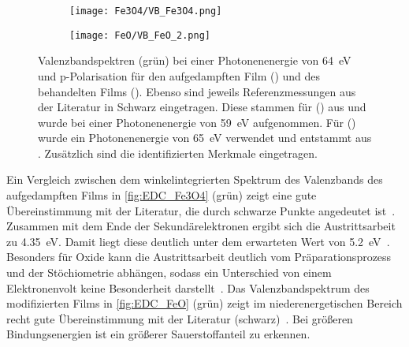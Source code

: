         \begin{figure}
            \begin{subfigure}[t]{0.48\textwidth}
                \centering
                \texttt{[image: Fe3O4/VB\_Fe3O4.png]}
                \subcaption{}
                \label{fig:EDC_Fe3O4}
            \end{subfigure}
            \begin{subfigure}[t]{0.48\textwidth}
                \centering
                \texttt{[image: FeO/VB\_FeO\_2.png]}
                \subcaption{}
                \label{fig:EDC_FeO}
            \end{subfigure}
            \caption{Valenzbandspektren (grün) bei einer Photonenenergie von \SI{64}{\electronvolt} und p-Polarisation für den aufgedampften Film () und des behandelten Films ().
            Ebenso sind jeweils Referenzmessungen aus der Literatur in Schwarz eingetragen.
            Diese stammen für () aus \cite{FeO_35} und wurde bei einer Photonenenergie von \SI{59}{\electronvolt} aufgenommen.
            Für () wurde ein Photonenenergie von \SI{65}{\electronvolt} verwendet und entstammt aus \cite{FeO_14}.
            Zusätzlich sind die identifizierten Merkmale eingetragen.}
            \label{fig:EDCs}
        \end{figure}
        Ein Vergleich zwischen dem winkelintegrierten Spektrum des Valenzbands des aufgedampften Films in \autoref{fig:EDC_Fe3O4} (grün) zeigt eine gute Übereinstimmung mit der Literatur, die durch schwarze Punkte angedeutet ist~\cite{FeO_35}.
        Zusammen mit dem Ende der Sekundärelektronen ergibt sich die Austrittsarbeit zu \SI{4.35}{\electronvolt}.
        Damit liegt diese deutlich unter dem erwarteten Wert von \SI{5.2}{\electronvolt}~\cite{FeO_40}.
        Besonders für Oxide kann die Austrittsarbeit deutlich vom Präparationsprozess und der Stöchiometrie abhängen, sodass ein Unterschied von einem Elektronenvolt keine Besonderheit darstellt~\cite{IF_11}.
        Das Valenzbandspektrum des modifizierten Films in \autoref{fig:EDC_FeO} (grün) zeigt im niederenergetischen Bereich recht gute Übereinstimmung mit der Literatur (schwarz)~\cite{FeO_14}.
        Bei größeren Bindungsenergien ist ein größerer Sauerstoffanteil zu erkennen.
